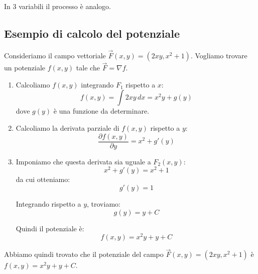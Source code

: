 In 3 variabili il processo è analogo.\\
\subsection{Esempio di calcolo del potenziale}

Consideriamo il campo vettoriale $\vec F(x,y) = (2xy, x^2 + 1)$. Vogliamo trovare un potenziale $f(x,y)$ tale che $\vec F = \nabla f$.

\begin{enumerate}
\item Calcoliamo $f(x,y)$ integrando $F_1$ rispetto a $x$:
$$ f(x,y) = \int 2xy \, dx = x^2 y + g(y) $$
dove $g(y)$ è una funzione da determinare.

\item Calcoliamo la derivata parziale di $f(x,y)$ rispetto a $y$:
$$ \frac{\partial f(x,y)}{\partial y} = x^2 + g'(y) $$

\item Imponiamo che questa derivata sia uguale a $F_2(x,y)$:
$$ x^2 + g'(y) = x^2 + 1 $$
da cui otteniamo:
$$ g'(y) = 1 $$

Integrando rispetto a $y$, troviamo:
$$ g(y) = y + C $$

Quindi il potenziale è:
$$ f(x,y) = x^2 y + y + C $$
\end{enumerate}

Abbiamo quindi trovato che il potenziale del campo $\vec F(x,y) = (2xy, x^2 + 1)$ è $f(x,y) = x^2 y + y + C$.\\




